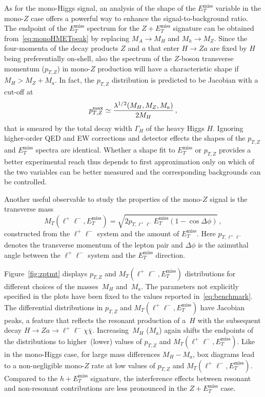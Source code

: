 \documentclass[a4paper, 11pt,notoc]{article}
\newcommand{\MET}{\ensuremath{E_T^\mathrm{miss}}\xspace}
\newcommand{\ma}{\ensuremath{M_{a}}\xspace}
\newcommand{\mH}{\ensuremath{M_{H}}\xspace}
\begin{document}
As for the mono-Higgs signal, an analysis of the shape of the $\MET$ variable in the mono-$Z$ case offers a powerful way to enhance the signal-to-background ratio. The endpoint of the $\MET$ spectrum for the $Z+\MET$ signature can be obtained from~\eqref{eq:monoHMETpeak} by  replacing $M_A \to M_H$ and $M_h \to M_Z$.  Since the four-momenta of the decay products $Z$ and $a$ that enter $H \to Za$ are fixed by $H$ being preferentially on-shell, also the spectrum of the $Z$-boson transverse momentum ($p_{T,Z}$) in mono-$Z$ production will have a characteristic shape if $M_H > M_Z + M_a$.   In fact,  the $p_{T,Z}$ distribution is predicted  to be Jacobian with a cut-off at~\cite{No:2015xqa,Bauer:2017ota}
\begin{equation} \label{eq:monoZpTpeak}
p_{T,Z}^{ {\rm max} } \simeq \frac{\lambda^{1/2}(M_H, M_Z, M_a)}{2 M_H}\,,
\end{equation}
that is smeared by the total decay width $\Gamma_H$ of the heavy Higgs $H$. Ignoring higher-order QED and EW corrections and detector effects the shapes of the $p_{T,Z}$ and $\MET$ spectra are identical. Whether a shape fit to $\MET$ or $p_{T,Z}$ provides a better experimental reach thus depends to first approximation only on which of the two variables can be better measured and the corresponding backgrounds can be controlled.

Another useful observable to study the properties of the mono-$Z$ signal is the transverse mass 
\begin{equation} \label{eq:transversemass}
M_T (\ell^+ \ell^-,\MET) = \sqrt{2 p_{T, \ell^+ \ell^-}  \MET  \left ( 1- \cos \Delta \phi \right )} \,,
\end{equation}
constructed from the $\ell^+ \ell^-$ system and the amount of $\MET$. Here $p_{T, \ell^+ \ell^-}$ denotes the transverse momentum of the lepton pair and $\Delta \phi$ is the azimuthal angle between the $\ell^+ \ell^-$ system and the $\MET$ direction.

Figure~\ref{fig:zptmt} displays  $p_{T,Z}$ and $M_T(\ell^+ \ell^-, \MET)$ distributions for different choices of the masses~$M_H$ and~$M_a$. The parameters not explicitly specified in the plots have been  fixed to the values reported in~\eqref{eq:benchmark}. The differential distributions in $p_{T,Z}$ and $M_T(\ell^+ \ell^-, \MET)$ have Jacobian peaks, a feature that  reflects the resonant production of a~$H$ with the subsequent decay $H \to Z a \to \ell^+ \ell^- \chi \bar \chi$.  Increasing~$\mH$ ($\ma$) again shifts the endpoints of the distributions to higher~(lower) values of $p_{T,Z}$ and $M_T(\ell^+ \ell^-, \MET)$. Like in the mono-Higgs case, for large mass differences $M_H - M_a$, box diagrams lead to a non-negligible mono-$Z$ rate at low values of $p_{T,Z}$ and $M_T(\ell^+ \ell^-, \MET)$. Compared to the $h + \MET$ signature, the interference effects between resonant and non-resonant contributions  are less pronounced  in  the $Z + \MET$  case. 
\end{document}
